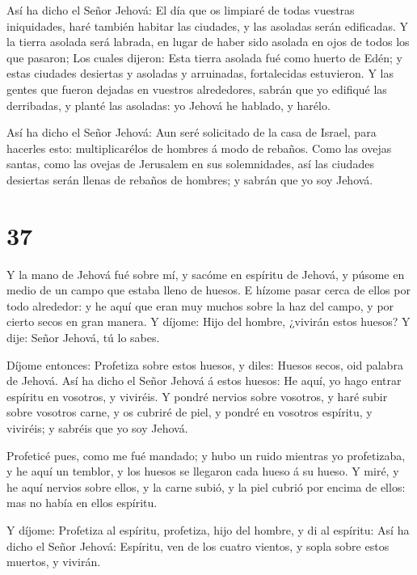  Así ha dicho el Señor Jehová: El día que os limpiaré de
todas vuestras iniquidades, haré también habitar las ciudades, y las
asoladas serán edificadas.  Y la tierra asolada será
labrada, en lugar de haber sido asolada en ojos de todos los que
pasaron;  Los cuales dijeron: Esta tierra asolada fué como
huerto de Edén; y estas ciudades desiertas y asoladas y arruinadas,
fortalecidas estuvieron.  Y las gentes que fueron dejadas
en vuestros alrededores, sabrán que yo edifiqué las derribadas, y planté
las asoladas: yo Jehová he hablado, y harélo.

 Así ha dicho el Señor Jehová: Aun seré solicitado de la
casa de Israel, para hacerles esto: multiplicarélos de hombres á modo de
rebaños.  Como las ovejas santas, como las ovejas de
Jerusalem en sus solemnidades, así las ciudades desiertas serán llenas
de rebaños de hombres; y sabrán que yo soy Jehová.

\hypertarget{section-36}{%
\section{37}\label{section-36}}

 Y la mano de Jehová fué sobre mí, y sacóme en espíritu de
Jehová, y púsome en medio de un campo que estaba lleno de huesos.
 E hízome pasar cerca de ellos por todo alrededor: y he aquí
que eran muy muchos sobre la haz del campo, y por cierto secos en gran
manera.  Y díjome: Hijo del hombre, ¿vivirán estos huesos? Y
dije: Señor Jehová, tú lo sabes.

 Díjome entonces: Profetiza sobre estos huesos, y diles:
Huesos secos, oid palabra de Jehová.  Así ha dicho el Señor
Jehová á estos huesos: He aquí, yo hago entrar espíritu en vosotros, y
viviréis.  Y pondré nervios sobre vosotros, y haré subir
sobre vosotros carne, y os cubriré de piel, y pondré en vosotros
espíritu, y viviréis; y sabréis que yo soy Jehová.

 Profeticé pues, como me fué mandado; y hubo un ruido
mientras yo profetizaba, y he aquí un temblor, y los huesos se llegaron
cada hueso á su hueso.  Y miré, y he aquí nervios sobre
ellos, y la carne subió, y la piel cubrió por encima de ellos: mas no
había en ellos espíritu.

 Y díjome: Profetiza al espíritu, profetiza, hijo del
hombre, y di al espíritu: Así ha dicho el Señor Jehová: Espíritu, ven de
los cuatro vientos, y sopla sobre estos muertos, y vivirán.

